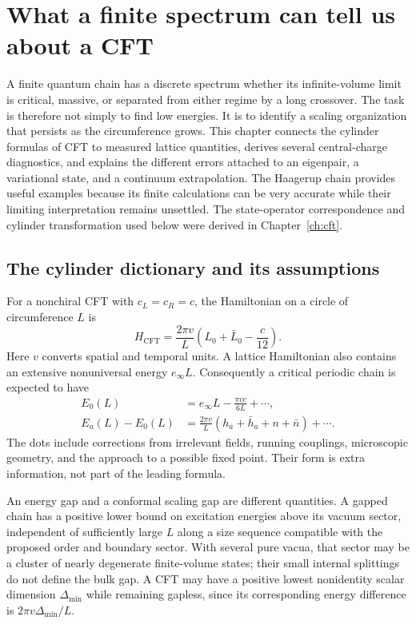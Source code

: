 \chapter{What a finite spectrum can tell us about a CFT}
\label{ch:scaling}

A finite quantum chain has a discrete spectrum whether its infinite-volume
limit is critical, massive, or separated from either regime by a long
crossover. The task is therefore not simply to find low energies. It is to
identify a scaling organization that persists as the circumference grows.
This chapter connects the cylinder formulas of CFT to measured lattice
quantities, derives several central-charge diagnostics, and explains the
different errors attached to an eigenpair, a variational state, and a
continuum extrapolation. The Haagerup chain provides useful examples because
its finite calculations can be very accurate while their limiting
interpretation remains unsettled.
The state-operator correspondence and cylinder transformation used
below were derived in Chapter~\ref{ch:cft}.

\section{The cylinder dictionary and its assumptions}

For a nonchiral CFT with $c_L=c_R=c$, the Hamiltonian on a circle of
circumference $L$ is
\begin{equation}
 H_{\mathrm{CFT}}=\frac{2\pi v}{L}
       \left(L_0+\bar L_0-\frac c{12}\right).
 \label{eq:cylinder-H-lattice}
\end{equation}
Here $v$ converts spatial and temporal units. A lattice Hamiltonian also
contains an extensive nonuniversal energy $e_\infty L$. Consequently a
critical periodic chain is expected to have
\begin{align}
 E_0(L)&=e_\infty L-\frac{\pi vc}{6L}+\cdots,\label{eq:casimir}\\
 E_a(L)-E_0(L)&=\frac{2\pi v}{L}
       \left(h_a+\bar h_a+n+\bar n\right)+\cdots.\label{eq:gap-dictionary}
\end{align}
The dots include corrections from irrelevant fields, running couplings,
microscopic geometry, and the approach to a possible fixed point. Their
form is extra information, not part of the leading formula.

An energy gap and a conformal scaling gap are different quantities.
A gapped chain has a positive lower bound on excitation energies above
its vacuum sector, independent of sufficiently large $L$ along a size
sequence compatible with the proposed order and boundary sector. With several
pure vacua, that sector may be a cluster of nearly degenerate
finite-volume states; their small internal splittings do not define
the bulk gap. A CFT may have a positive lowest nonidentity scalar
dimension $\Delta_{\min}$ while remaining gapless, since its
corresponding energy difference is $2\pi v\Delta_{\min}/L$.

